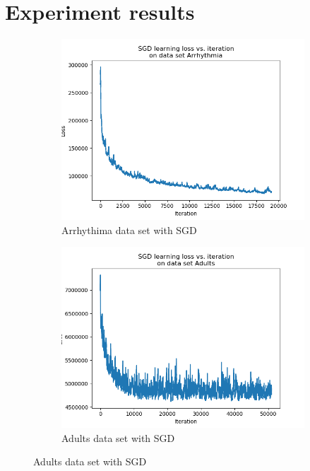 \documentclass{article}
\begin{document}
\section{Experiment results}
\label{appendix-results}

\begin{figure}[H]
	\centering
	\begin{subfigure}[t]{0.45\linewidth}
		\includegraphics[width=\linewidth]{figs/loss/arrhythmia_sgd.png}
		\caption{Arrhythima data set with SGD}
	\end{subfigure}
	\begin{subfigure}[t]{0.45\linewidth}
		\includegraphics[width=\linewidth]{figs/loss/adults_sgd.png}
		\caption{Adults data set with SGD}
	\end{subfigure}


\end{figure}
\end{document}
